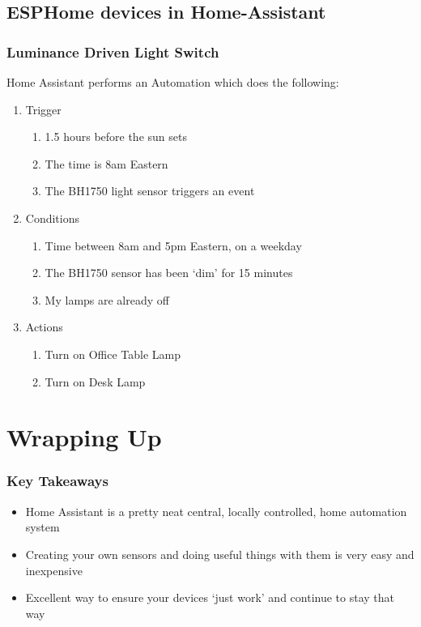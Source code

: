 \documentclass[aspectratio=169]{beamer}
\begin{document}
\subsection{ESPHome devices in Home-Assistant}
\begin{frame}[fragile]
  \frametitle{Luminance Driven Light Switch}
  Home Assistant performs an Automation which does the following:
  \begin{enumerate}%
    \item{Trigger}
      \begin{enumerate}
        \item{1.5 hours before the sun sets}
        \item{The time is 8am Eastern}
        \item{The BH1750 light sensor triggers an event}
      \end{enumerate}
    \item{Conditions}
      \begin{enumerate}
        \item{Time between 8am and 5pm Eastern, on a weekday}
        \item{The BH1750 sensor has been `dim' for 15 minutes}
        \item{My lamps are already off}
      \end{enumerate}
    \item{Actions}
      \begin{enumerate}
        \item{Turn on Office Table Lamp}
        \item{Turn on Desk Lamp}
      \end{enumerate}
  \end{enumerate}
\end{frame}

\section{Wrapping Up}
\frame{\sectionpage}

\begin{frame}
  \frametitle{Key Takeaways}
  \begin{itemize}[<+->]
    \item{Home Assistant is a pretty neat central, locally controlled, home automation system}
    \item{Creating your own sensors and doing useful things with them is very easy and inexpensive}
    \item{Excellent way to ensure your devices `just work' and continue to stay that way}
  \end{itemize}
\end{frame}
\end{document}
